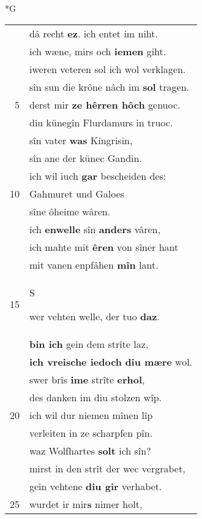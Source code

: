 \documentclass[8pt,a4paper,notitlepage]{article}
\begin{document}
\begin{table}[ht]
\begin{minipage}[t]{0.5\linewidth}
\end{minipage}
\end{table}
\newpage
\begin{table}[ht]
\begin{minipage}[t]{0.5\linewidth}
\small
\begin{center}*G
\end{center}
\begin{tabular}{rl}
 & dâ recht \textbf{ez}. ich entet im niht.\\ 
 & ich wæne, mirs och \textbf{iemen} giht.\\ 
 & iweren veteren sol ich wol verklagen.\\ 
 & sîn sun die krône nâch im \textbf{sol} tragen.\\ 
5 & derst mir \textbf{ze hêrren hôch} genuoc.\\ 
 & diu künegîn Flurdamurs in truoc.\\ 
 & sîn vater \textbf{was} Kingrisin,\\ 
 & sîn ane der künec Gandin.\\ 
 & ich wil iuch \textbf{gar} bescheiden des:\\ 
10 & Gahmuret und Galoes\\ 
 & sîne ôheime wâren.\\ 
 & ich \textbf{en}\textbf{welle} sîn \textbf{anders} vâren,\\ 
 & ich mahte mit \textbf{êren} von sîner hant\\ 
 & mit vanen enpfâhen \textbf{mîn} lant.\\ 
15 & \begin{large}S\end{large}wer vehten welle, der tuo \textbf{daz}.\\ 
 & \textbf{bin ich} gein dem strîte laz,\\ 
 & \textbf{ich vreische iedoch} \textbf{diu mære} wol.\\ 
 & swer brîs \textbf{ime} strîte \textbf{erhol},\\ 
 & des danken im diu stolzen wîp.\\ 
20 & ich wil dur niemen mînen lîp\\ 
 & verleiten in ze scharpfen pîn.\\ 
 & waz Wolfhartes \textbf{solt} ich sîn?\\ 
 & mirst in den strît der wec vergrabet,\\ 
 & gein vehtene \textbf{diu gir} verhabet.\\ 
25 & wurdet ir mir\textbf{s} nimer holt,\\ 

\end{tabular}
\end{minipage}
\end{table}
\end{document}
